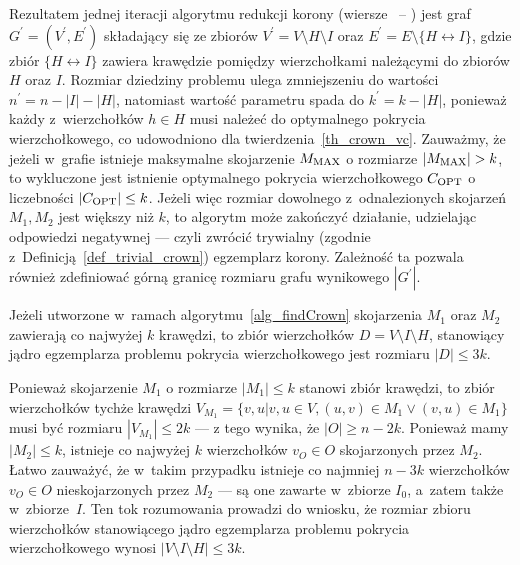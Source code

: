 \par{
  Rezultatem jednej iteracji algorytmu redukcji korony (wiersze~ -- ) jest graf
  $G^\prime=(V^\prime, E^\prime)$ składający się ze zbiorów $V^\prime=V\setminus H \setminus I$ oraz $E^\prime = E \setminus \{H\leftrightarrow I\}$, gdzie zbiór $\{H\leftrightarrow I\}$ zawiera krawędzie pomiędzy wierzchołkami należącymi do zbiorów $H$ oraz $I$.
  Rozmiar dziedziny problemu ulega zmniejszeniu do wartości $n^\prime=n-|I|-|H|$, natomiast wartość parametru spada do $k^\prime=k-|H|$, ponieważ każdy z~wierzchołków $h \in H$ musi należeć do optymalnego pokrycia wierzchołkowego, co udowodniono dla twierdzenia~\ref{th_crown_vc}.
  Zauważmy, że jeżeli w~grafie istnieje maksymalne skojarzenie $M_{\textnormal{MAX}}$ o rozmiarze $|M_{\textnormal{MAX}}| > k$, to wykluczone jest istnienie optymalnego pokrycia wierzchołkowego $C_{\textnormal{OPT}}$ o liczebności $|C_{\textnormal{OPT}}|\leq k$.
  Jeżeli więc rozmiar dowolnego z~odnalezionych skojarzeń $M_1, M_2$ jest większy niż $k$, to algorytm może zakończyć działanie, udzielając odpowiedzi negatywnej --- czyli zwrócić trywialny (zgodnie z~Definicją~\ref{def_trivial_crown}) egzemplarz korony.
  Zależność ta pozwala również zdefiniować górną granicę rozmiaru grafu wynikowego $|G^\prime|$.
}
\begin{theorem}
  Jeżeli utworzone w~ramach algorytmu~\ref{alg_findCrown} skojarzenia $M_1$ oraz $M_2$ zawierają co najwyżej $k$ krawędzi, to zbiór wierzchołków $D=V \setminus I \setminus H$, stanowiący jądro egzemplarza problemu pokrycia wierzchołkowego jest rozmiaru $|D| \leq 3k$.
\end{theorem}
\begin{bproof}
  Ponieważ skojarzenie $M_1$ o rozmiarze $|M_1| \leq k$ stanowi zbiór krawędzi, to zbiór wierzchołków tychże krawędzi $V_{M_1}=\{v, u|v, u \in V, (u,v)\in M_1 \lor (v,u) \in M_1\}$ musi być rozmiaru $ |V_{M_1}| \leq 2k$ --- z tego wynika, że $|O| \geq n-2k$.
  Ponieważ mamy $|M_2| \leq k$, istnieje co najwyżej $k$ wierzchołków $v_O \in O$ skojarzonych przez $M_2$.
  Łatwo zauważyć, że w~takim przypadku istnieje co najmniej $n-3k$ wierzchołków $v_O \in O$ nieskojarzonych przez $M_2$ --- są one zawarte w~zbiorze $I_0$, a~zatem także w~zbiorze~$I$.
  Ten tok rozumowania prowadzi do wniosku, że rozmiar zbioru wierzchołków stanowiącego jądro egzemplarza problemu pokrycia wierzchołkowego wynosi $|V \setminus I \setminus H| \leq 3k$.
\end{bproof}
